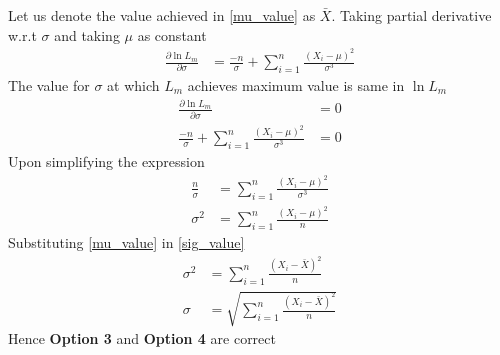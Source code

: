 \documentclass[journal,12pt,twocolumn]{IEEEtran}
\begin{document}
Let us denote the value achieved in \eqref{mu_value} as $\bar{X}$. Taking partial derivative w.r.t $\sigma$ and taking $\mu$ as constant
\begin{align}
    \frac{\partial \ln{L_m}}{\partial \sigma} &= \frac{-n}{\sigma} + \sum_{i=1}^n\frac{(X_i - \mu)^2}{\sigma^3}
\end{align}
The value for $\sigma$ at which $L_m$ achieves maximum value is same in $\ln{L_m}$
\begin{align}
    \frac{\partial \ln{L_m}}{\partial \sigma} &= 0\\
    \frac{-n}{\sigma} + \sum_{i=1}^n\frac{(X_i - \mu)^2}{\sigma^3} &=0
\end{align}
Upon simplifying the expression
\begin{align}
\frac{n}{\sigma} &= \sum_{i=1}^n \frac{(X_i -\mu)^2}{\sigma^3}\\
{\sigma^2} &= \sum_{i=1}^n\frac{(X_i-\mu)^2}{n}\label{sig_value}
\end{align}
Substituting \eqref{mu_value} in \eqref{sig_value}
\begin{align}
    {\sigma^2} &= \sum_{i=1}^n\frac{(X_i-\bar{X})^2}{n}\\
    {\sigma} &= \sqrt{\sum_{i=1}^n\frac{(X_i-\bar{X})^2}{n}}
\end{align}
Hence \textbf{Option 3} and \textbf{Option 4} are correct
\end{document}
